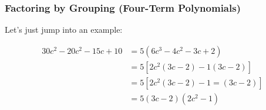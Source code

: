 
\subsubsection*{Factoring by Grouping (Four-Term Polynomials) }

Let's just jump into an example:

\begin{example}[Factor $30c^3 - 20c^2 - 15c + 10$]
    \begin{align}
        30c^2 - 20c^2 -15c + 10 &= 5(6c^3 - 4c^2 - 3c + 2) \\
                                &= 5[2c^2 (3c - 2) - 1 (3c - 2)] \\
                                &= 5[2c^2 (3c - 2) - 1 = (3c - 2)] \\
                                &= 5(3c - 2)(2c^2 - 1)
    \end{align}
\end{example}

\newpage
